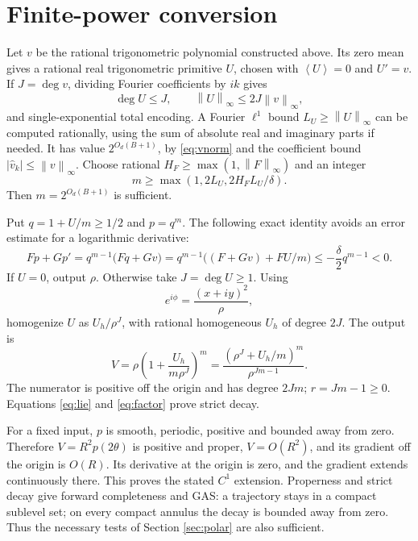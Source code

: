 \documentclass[11pt]{article}
\theoremstyle{remark}\newtheorem{remark}[theorem]{Remark}
\newcommand{\mean}[1]{\left\langle #1\right\rangle}
\newcommand{\norm}[1]{\left\|#1\right\|_\infty}
\newcommand{\se}{2^{O_d(B+1)}}
\begin{document}
\section{Finite-power conversion}\label{sec:power}

Let \(v\) be the rational trigonometric polynomial constructed above.
Its zero mean gives a rational real trigonometric primitive \(U\), chosen with \(\mean U=0\) and \(U'=v\). If \(J=\deg v\), dividing Fourier coefficients by \(ik\) gives
\[
 \deg U\leq J,\qquad \norm U\leq2J\norm v,
\]
and single-exponential total encoding. A Fourier \(\ell^1\) bound \(L_U\geq\norm U\) can be computed rationally, using the sum of absolute real and imaginary parts if needed. It has value \(\se\), by \eqref{eq:vnorm} and the coefficient bound
\(|\widehat v_k|\leq\norm v\).
Choose rational \(H_F\geq\max(1,\norm F)\) and an integer
\begin{equation}\label{eq:m}
                   m\geq\max(1,2L_U,2H_FL_U/\delta).
\end{equation}
Then \(m=\se\) is sufficient.

Put \(q=1+U/m\geq1/2\) and \(p=q^m\). The following exact identity avoids an error estimate for a logarithmic derivative:
\begin{equation}\label{eq:factor}
 Fp+Gp'
 =q^{m-1}\bigl(Fq+Gv\bigr)
 =q^{m-1}\bigl((F+Gv)+FU/m\bigr)
 \leq-\frac\delta2q^{m-1}<0.
\end{equation}
If \(U=0\), output \(\rho\). Otherwise take \(J=\deg U\geq1\).
Using
\[
                         e^{i\phi}=\frac{(x+iy)^2}{\rho},
\]
homogenize \(U\) as \(U_h/\rho^J\), with rational homogeneous \(U_h\) of degree \(2J\). The output is
\begin{equation}\label{eq:powercertificate}
 V=\rho\left(1+\frac{U_h}{m\rho^J}\right)^m
   =\frac{(\rho^J+U_h/m)^m}{\rho^{Jm-1}}.
\end{equation}
The numerator is positive off the origin and has degree \(2Jm\); \(r=Jm-1\geq0\).
Equations \eqref{eq:lie} and \eqref{eq:factor} prove strict decay.

For a fixed input, \(p\) is smooth, periodic, positive and bounded away from zero. Therefore \(V=R^2p(2\theta)\) is positive and proper, \(V=O(R^2)\), and its gradient off the origin is \(O(R)\). Its derivative at the origin is zero, and the gradient extends continuously there. This proves the stated \(C^1\) extension. Properness and strict decay give forward completeness and GAS: a trajectory stays in a compact sublevel set; on every compact annulus the decay is bounded away from zero. Thus the necessary tests of Section \ref{sec:polar} are also sufficient.
\end{document}
